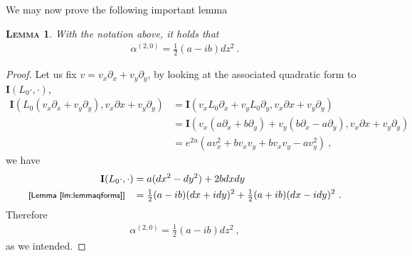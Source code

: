 \documentclass[a4paper,11pt,openright,twoside]{book}
\newcommand{\I}{\mathbf{I}}
\newcommand{\1}{\mathds{1}}
\newcommand{\commb}[1]{\textsf{{\footnotesize[#1]}}}
\theoremstyle{plain}
\newtheorem{lemma}[thm]{\textsc{Lemma}}
\theoremstyle{definition}
\theoremstyle{remark}
\begin{document}
We may now prove the following important lemma
\begin{lemma}\label{lm:hopfdifflocalform}
	With the notation above, it holds that
\begin{align*}
	\alpha^{(2,0)} = \tfrac{1}{2}(a-ib) dz^2
\ . 
\end{align*} 
\end{lemma}
\begin{proof}
	
Let us fix $v = v_x \partial_x +v_y \partial_y$, by looking at the associated quadratic form to $\I(L_0\cdot ,\cdot )$,
 \begin{align*}
	 \I(L_0(v_x\partial_x+v_y\partial_y),v_x\partial x+ v_y \partial_y)
	&= \I(v_xL_0\partial_x+v_yL_0\partial_y,v_x\partial x+ v_y \partial_y)\\
	&= \I(v_x(a\partial_x+b\partial_y)+v_y(b\partial_x-a\partial_y),v_x\partial x+ v_y \partial_y)\\
	&= e^{2u} \left(   a v_x^2+bv_xv_y+bv_xv_y-av_y^2\right)
 \ , 
 \end{align*}
 we have
\begin{align*}
	\I(L_0\cdot ,\cdot ) &= a(dx^2-dy^2) +2bdxdy\\
	\commb{Lemma \ref{lm:lemmaqforms}}\hspace{3mm}
	&=\tfrac{1}{2}(a-ib)(dx+idy)^2 +\tfrac{1}{2}(a+ib)(dx-idy)^2
\ . 
\end{align*}
Therefore 
\begin{align}\label{eq:trthm4}
	\alpha^{(2,0)} = \tfrac{1}{2}(a-ib)dz^2
\ , 
\end{align}
as we intended.
\end{proof}
\end{document}
